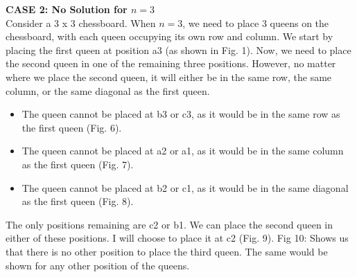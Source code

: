 \documentclass[12pt]{article}
\begin{document}
\begin{figure}[h]
\begin{minipage}{0.2\textwidth}
    \end{minipage}
\end{figure}



\textbf{CASE 2: No Solution for $n = 3$} \\[12pt]

Consider a 3 x 3 chessboard. When $n = 3$, we need to place 3 queens on the chessboard, with each queen occupying its own row and column. We start by placing the first queen at position a3 (as shown in Fig. 1). Now, we need to place the second queen in one of the remaining three positions. However, no matter where we place the second queen, it will either be in the same row, the same column, or the same diagonal as the first queen.

\begin{itemize}
    \item The queen cannot be placed at b3 or c3, as it would be in the same row as the first queen (Fig. 6).
    \item The queen cannot be placed at a2 or a1, as it would be in the same column as the first queen (Fig. 7).
    \item The queen cannot be placed at b2 or c1, as it would be in the same diagonal as the first queen (Fig. 8).
\end{itemize}

The only positions remaining are c2 or b1. We can place the second queen in either of these positions. I will choose to place it at c2 (Fig. 9). Fig 10: Shows us that there is no other position to place the third queen. 
The same would be shown for any other position of the queens. 
\end{document}
